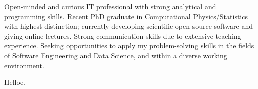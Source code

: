 \documentclass{tym-cv}
\begin{document}
\maketitle

\makefooter

\par{
Open-minded and curious IT professional with strong analytical and programming skills. Recent PhD graduate in Computational Physics/Statistics with highest distinction; currently developing scientific open-source software and giving online lectures. Strong communication skills due to extensive teaching experience. Seeking opportunities to apply my problem-solving skills in the fields of Software Engineering and Data Science, and within a diverse working environment.
}

{}

\pagebreak
Helloe.
\end{document}
